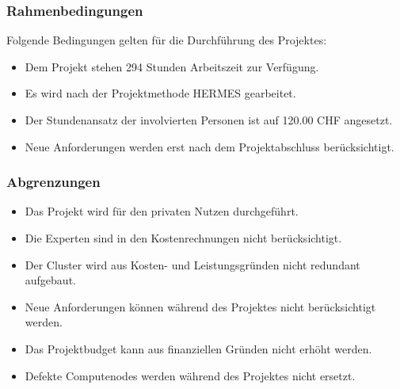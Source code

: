 \subsubsection{Rahmenbedingungen} 
\label{sec:Rahmenbedingungen}

Folgende Bedingungen gelten für die Durchführung des Projektes:
\begin{itemize}
	\item Dem Projekt stehen 294 Stunden Arbeitszeit zur Verfügung.
	\item Es wird nach der Projektmethode HERMES gearbeitet.
	\item Der Stundenansatz der involvierten Personen ist auf 120.00 CHF angesetzt.
	\item Neue Anforderungen werden erst nach dem Projektabschluss berücksichtigt.
\end{itemize}

\subsubsection{Abgrenzungen} 
\label{sec:Abgrenzungen}
\begin{itemize}
	\item Das Projekt wird für den privaten Nutzen durchgeführt.
	\item Die Experten sind in den Kostenrechnungen nicht berücksichtigt.
	\item Der Cluster wird aus Kosten- und Leistungsgründen nicht redundant aufgebaut.
	\item Neue Anforderungen können während des Projektes nicht berücksichtigt werden.
	\item Das Projektbudget kann aus finanziellen Gründen nicht erhöht werden.
	\item Defekte Computenodes werden während des Projektes nicht ersetzt.
\end{itemize}